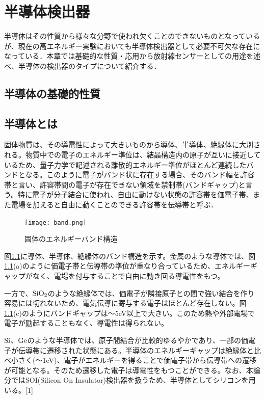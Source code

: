 \chapter{半導体検出器}
半導体はその性質から様々な分野で使われ欠くことのできないものとなっているが、現在の高エネルギー実験においても半導体検出器として必要不可欠な存在になっている．本章では基礎的な性質・応用から放射線センサーとしての用途を述べ、半導体の検出器のタイプについて紹介する．

\section{半導体の基礎的性質}
\section{半導体とは}
固体物質は、その導電性によって大きいものから導体、半導体、絶縁体に大別される。物質中での電子のエネルギー準位は、結晶構造内の原子が互いに接近しているため、量子力学で記述される離散的エネルギー準位がほとんど連続したバンドとなる。このように電子がバンド状に存在する場合、そのバンド幅を許容帯と言い、許容帯間の電子が存在できない領域を禁制帯(バンドギャップ)と言う。特に電子が分子結合に使われ、自由に動けない状態の許容帯を価電子帯、また電場を加えると自由に動くことのできる許容帯を伝導帯と呼ぶ．

\begin{figure}[!htbp]
\begin{center}
\texttt{[image: band.png]}
\end{center}
\caption{固体のエネルギーバンド構造}
\label{fig:バンド構造}
\end{figure}

 図\ref{fig:バンド構造}に導体、半導体、絶縁体のバンド構造を示す。金属のような導体では、図\ref{fig:バンド構造}(a)のように価電子帯と伝導帯の準位が重なり合っているため、エネルギーギャップがなく、電場を付与することで自由に動き回る導電性をもつ。

一方で、${\rm SiO_2}$のような絶縁体では、価電子が隣接原子との間で強い結合を作り容易には切れないため、電気伝導に寄与する電子はほとんど存在しない。図\ref{fig:バンド構造}(c)のようにバンドギャップは〜5eV以上で大きい。このため熱や外部電場で電子が励起することもなく、導電性は得られない。

${\rm Si}$、${\rm Ge}$のような半導体では、原子間結合が比較的ゆるやかであり、一部の価電子が伝導帯に遷移された状態にある。半導体のエネルギーギャップは絶縁体と比べ小さく(〜1eV)、電子がエネルギーを得ることで価電子帯から伝導帯への遷移が可能となる。そのため遷移した電子は導電性をもつことができる。なお、本論分ではSOI(Silicon On Insulator)検出器を扱うため、半導体としてシリコンを用いる。[1]



